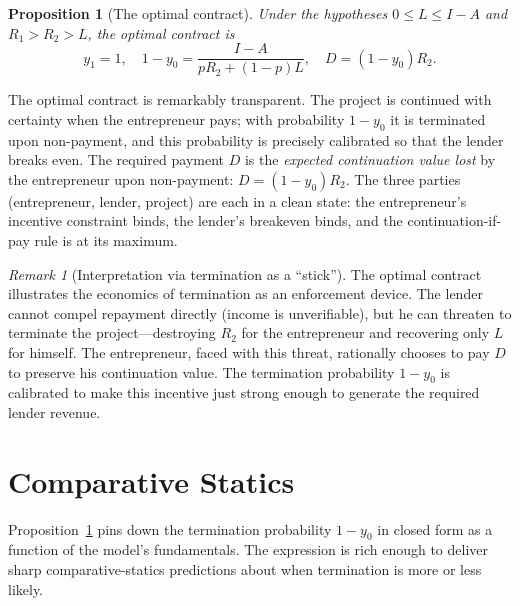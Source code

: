 \documentclass[11pt,a4paper,oneside]{book}
\def\leq{\leqslant}
\theoremstyle{plain}
\newtheorem{proposition}[theorem]{Proposition}
\theoremstyle{definition}
\theoremstyle{remark}
\newtheorem{remark}[theorem]{Remark}
\numberwithin{equation}{chapter}
\begin{document}
\begin{proposition}[The optimal contract]\label{prop:NV-optimal-form}
Under the hypotheses $0 \leq L \leq I - A$ and $R_1 > R_2 > L$, the optimal contract is
\begin{equation*}
  y_1 = 1,
  \quad
  1 - y_0 = \frac{I - A}{p R_2 + (1 - p) L},
  \quad
  D = (1 - y_0) R_2.
\end{equation*}
\end{proposition}

The optimal contract is remarkably transparent.
The project is continued with certainty when the entrepreneur pays; with probability $1 - y_0$ it is terminated upon non-payment, and this probability is precisely calibrated so that the lender breaks even.
The required payment $D$ is the \emph{expected continuation value lost} by the entrepreneur upon non-payment: $D = (1 - y_0) R_2$.
The three parties (entrepreneur, lender, project) are each in a clean state: the entrepreneur's incentive constraint binds, the lender's breakeven binds, and the continuation-if-pay rule is at its maximum.

\begin{remark}[Interpretation via termination as a ``stick'']\label{rem:termination-stick}
The optimal contract illustrates the economics of termination as an enforcement device.
The lender cannot compel repayment directly (income is unverifiable), but he can threaten to terminate the project---destroying $R_2$ for the entrepreneur and recovering only $L$ for himself.
The entrepreneur, faced with this threat, rationally chooses to pay $D$ to preserve his continuation value.
The termination probability $1 - y_0$ is calibrated to make this incentive just strong enough to generate the required lender revenue.
\end{remark}

\section{Comparative Statics}
\label{sec:NV-statics}

Proposition~\ref{prop:NV-optimal-form} pins down the termination probability $1 - y_0$ in closed form as a function of the model's fundamentals.
The expression is rich enough to deliver sharp comparative-statics predictions about when termination is more or less likely.
\end{document}
